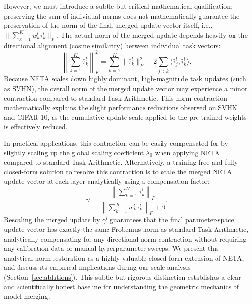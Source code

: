 However, we must introduce a subtle but critical mathematical qualification: preserving the sum of individual norms does not mathematically guarantee the preservation of the norm of the final, merged update vector itself, i.e., $\|\sum_{k=1}^K w_k^l \tau_k^l\|_F$. The actual norm of the merged update depends heavily on the directional alignment (cosine similarity) between individual task vectors:
\begin{equation}
\label{eq:norm_alignment}
\left\| \sum_{k=1}^K \hat{\tau}_k^l \right\|_F^2 = \sum_{k=1}^K \|\hat{\tau}_k^l\|_F^2 + 2 \sum_{j < k} \langle \hat{\tau}_j^l, \hat{\tau}_k^l \rangle.
\end{equation}
Because NETA scales down highly dominant, high-magnitude task updates (such as SVHN), the overall norm of the merged update vector may experience a minor contraction compared to standard Task Arithmetic. This norm contraction mathematically explains the slight performance reductions observed on SVHN and CIFAR-10, as the cumulative update scale applied to the pre-trained weights is effectively reduced. 

In practical applications, this contraction can be easily compensated for by slightly scaling up the global scaling coefficient $\lambda_0$ when applying NETA compared to standard Task Arithmetic. Alternatively, a training-free and fully closed-form solution to resolve this contraction is to scale the merged NETA update vector at each layer analytically using a compensation factor:
\begin{equation}
\label{eq:compensation_factor}
\gamma^l = \frac{\left\| \sum_{k=1}^K \tau_k^l \right\|_F}{\left\| \sum_{k=1}^K w_k^l \tau_k^l \right\|_F + \beta}.
\end{equation}
Rescaling the merged update by $\gamma^l$ guarantees that the final parameter-space update vector has exactly the same Frobenius norm as standard Task Arithmetic, analytically compensating for any directional norm contraction without requiring any calibration data or manual hyperparameter sweeps. We present this analytical norm-restoration as a highly valuable closed-form extension of NETA, and discuss its empirical implications during our scale analysis (Section~\ref{sec:ablations}). This subtle but rigorous distinction establishes a clear and scientifically honest baseline for understanding the geometric mechanics of model merging.
